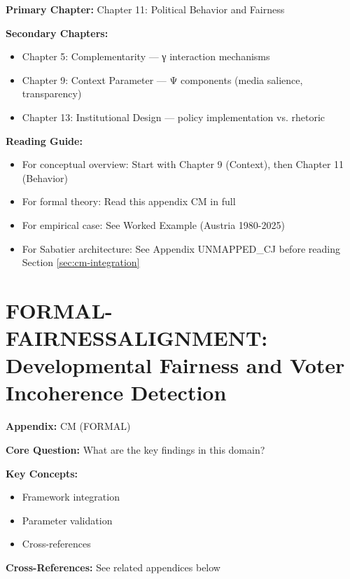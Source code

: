 \begin{tcolorbox}[colback=purple!5!white, colframe=purple!75!black,
    title=Chapter Linkage]

\textbf{Primary Chapter:} Chapter 11: Political Behavior and Fairness

\textbf{Secondary Chapters:}
\begin{itemize}[nosep]
\item Chapter 5: Complementarity --- γ interaction mechanisms
\item Chapter 9: Context Parameter --- Ψ components (media salience, transparency)
\item Chapter 13: Institutional Design --- policy implementation vs. rhetoric
\end{itemize}

\textbf{Reading Guide:}
\begin{itemize}[nosep]
\item For conceptual overview: Start with Chapter 9 (Context), then Chapter 11 (Behavior)
\item For formal theory: Read this appendix CM in full
\item For empirical case: See Worked Example (Austria 1980-2025)
\item For Sabatier architecture: See Appendix UNMAPPED_CJ before reading Section \ref{sec:cm-integration}
\end{itemize}

\end{tcolorbox}

\chapter{FORMAL-FAIRNESSALIGNMENT: Developmental Fairness and Voter Incoherence Detection}
\label{app:fairness-alignment}

\begin{tcolorbox}[colback=blue!5!white, colframe=blue!75!black,
    title=Quick Reference: Appendix UNMAPPED_CM]

\textbf{Appendix:} CM (FORMAL)

\textbf{Core Question:} What are the key findings in this domain?

\textbf{Key Concepts:}
\begin{itemize}[nosep]
\item Framework integration
\item Parameter validation
\item Cross-references
\end{itemize}

\textbf{Cross-References:} See related appendices below
\end{tcolorbox}

